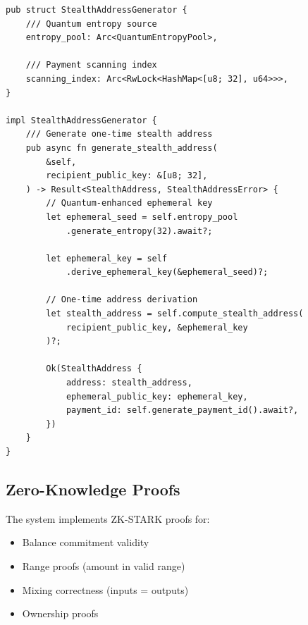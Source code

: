 \documentclass[12pt,a4paper]{article}
\begin{document}
\begin{lstlisting}[style=rustcode, caption=Stealth Address Generation]
pub struct StealthAddressGenerator {
    /// Quantum entropy source
    entropy_pool: Arc<QuantumEntropyPool>,

    /// Payment scanning index
    scanning_index: Arc<RwLock<HashMap<[u8; 32], u64>>>,
}

impl StealthAddressGenerator {
    /// Generate one-time stealth address
    pub async fn generate_stealth_address(
        &self,
        recipient_public_key: &[u8; 32],
    ) -> Result<StealthAddress, StealthAddressError> {
        // Quantum-enhanced ephemeral key
        let ephemeral_seed = self.entropy_pool
            .generate_entropy(32).await?;

        let ephemeral_key = self
            .derive_ephemeral_key(&ephemeral_seed)?;

        // One-time address derivation
        let stealth_address = self.compute_stealth_address(
            recipient_public_key, &ephemeral_key
        )?;

        Ok(StealthAddress {
            address: stealth_address,
            ephemeral_public_key: ephemeral_key,
            payment_id: self.generate_payment_id().await?,
        })
    }
}
\end{lstlisting}

\subsection{Zero-Knowledge Proofs}

The system implements ZK-STARK proofs for:
\begin{itemize}
\item Balance commitment validity
\item Range proofs (amount in valid range)
\item Mixing correctness (inputs = outputs)
\item Ownership proofs
\end{itemize}
\end{document}
